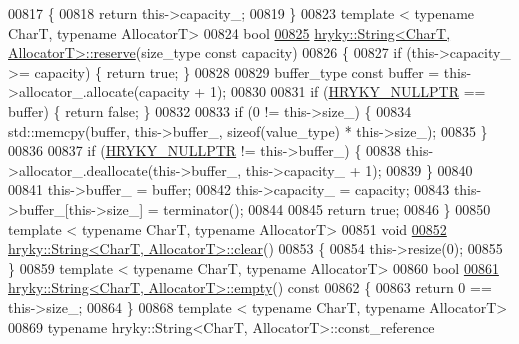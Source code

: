 \begin{DoxyCode}
00817 \textcolor{keyword}{}\{
00818     \textcolor{keywordflow}{return} this->capacity\_;
00819 \}
00823 \textcolor{keyword}{template} < \textcolor{keyword}{typename} CharT, \textcolor{keyword}{typename} AllocatorT>
00824 \textcolor{keywordtype}{bool}
\hypertarget{string_8h_source_l00825}{}\hyperlink{classhryky_1_1_string_aae6ce7131e8bb4c2cf03689a6a183b8d}{00825} \hyperlink{classhryky_1_1_string}{hryky::String<CharT, AllocatorT>::reserve}(size\_type \textcolor{keyword}{const} capacity)
00826 \{
00827     \textcolor{keywordflow}{if} (this->capacity\_ >= capacity) \{ \textcolor{keywordflow}{return} \textcolor{keyword}{true}; \}
00828 
00829     buffer\_type \textcolor{keyword}{const} buffer = this->allocator\_.allocate(capacity + 1);
00830 
00831     \textcolor{keywordflow}{if} (\hyperlink{common_8h_a4cd4ac09cfcdbd6b30ee69afc156e210}{HRYKY_NULLPTR} == buffer) \{ \textcolor{keywordflow}{return} \textcolor{keyword}{false}; \}
00832 
00833     \textcolor{keywordflow}{if} (0 != this->size\_) \{
00834         std::memcpy(buffer, this->buffer\_, \textcolor{keyword}{sizeof}(value\_type) * this->size\_);
00835     \}
00836 
00837     \textcolor{keywordflow}{if} (\hyperlink{common_8h_a4cd4ac09cfcdbd6b30ee69afc156e210}{HRYKY_NULLPTR} != this->buffer\_) \{
00838         this->allocator\_.deallocate(this->buffer\_, this->capacity\_ + 1);
00839     \}
00840 
00841     this->buffer\_ = buffer;
00842     this->capacity\_ = capacity;
00843     this->buffer\_[this->size\_] = terminator();
00844 
00845     \textcolor{keywordflow}{return} \textcolor{keyword}{true};
00846 \}
00850 \textcolor{keyword}{template} < \textcolor{keyword}{typename} CharT, \textcolor{keyword}{typename} AllocatorT>
00851 \textcolor{keywordtype}{void}
\hypertarget{string_8h_source_l00852}{}\hyperlink{classhryky_1_1_string_aeb2e094c044bcfc83c814e1610a98e70}{00852} \hyperlink{namespacehryky_aa201297ea9530da954a7230be71cc19d}{hryky::String<CharT, AllocatorT>::clear}()
00853 \{
00854     this->resize(0);
00855 \}
00859 \textcolor{keyword}{template} < \textcolor{keyword}{typename} CharT, \textcolor{keyword}{typename} AllocatorT>
00860 \textcolor{keywordtype}{bool}
\hypertarget{string_8h_source_l00861}{}\hyperlink{classhryky_1_1_string_aff01fafe438f65219695edae5459ed31}{00861} \hyperlink{classhryky_1_1_string}{hryky::String<CharT, AllocatorT>::empty}()\textcolor{keyword}{ const}
00862 \textcolor{keyword}{}\{
00863     \textcolor{keywordflow}{return} 0 == this->size\_;
00864 \}
00868 \textcolor{keyword}{template} < \textcolor{keyword}{typename} CharT, \textcolor{keyword}{typename} AllocatorT>
00869 \textcolor{keyword}{typename} hryky::String<CharT, AllocatorT>::const\_reference

\end{DoxyCode}

